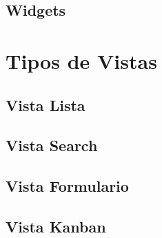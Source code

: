 \documentclass[letterpaper,10pt,spanish]{sphinxmanual}
\begin{document}
\subsection{Widgets}
\label{\detokenize{tecnico/vistas/estructura-y-sintaxis/widgets:widgets}}\label{\detokenize{tecnico/vistas/estructura-y-sintaxis/widgets:id1}}\label{\detokenize{tecnico/vistas/estructura-y-sintaxis/widgets::doc}}

\section{Tipos de Vistas}
\label{\detokenize{tecnico/vistas/tipos-de-vistas:tipos-de-vistas}}\label{\detokenize{tecnico/vistas/tipos-de-vistas:id1}}\label{\detokenize{tecnico/vistas/tipos-de-vistas::doc}}

\subsection{Vista Lista}
\label{\detokenize{tecnico/vistas/tipos-de-vistas/vista-lista:vista-lista}}\label{\detokenize{tecnico/vistas/tipos-de-vistas/vista-lista:id1}}\label{\detokenize{tecnico/vistas/tipos-de-vistas/vista-lista::doc}}

\subsection{Vista Search}
\label{\detokenize{tecnico/vistas/tipos-de-vistas/vista-search:vista-search}}\label{\detokenize{tecnico/vistas/tipos-de-vistas/vista-search:id1}}\label{\detokenize{tecnico/vistas/tipos-de-vistas/vista-search::doc}}

\subsection{Vista Formulario}
\label{\detokenize{tecnico/vistas/tipos-de-vistas/vista-formulario:vista-formulario}}\label{\detokenize{tecnico/vistas/tipos-de-vistas/vista-formulario:id1}}\label{\detokenize{tecnico/vistas/tipos-de-vistas/vista-formulario::doc}}

\subsection{Vista Kanban}
\label{\detokenize{tecnico/vistas/tipos-de-vistas/vista-kanban:vista-kanban}}\label{\detokenize{tecnico/vistas/tipos-de-vistas/vista-kanban:id1}}\label{\detokenize{tecnico/vistas/tipos-de-vistas/vista-kanban::doc}}
\end{document}

